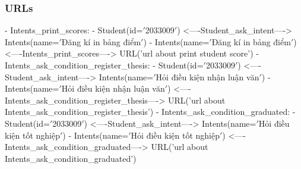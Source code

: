             \subsubsection{URLs}
            - Intents\_print\_scores:
                  - Student(id=\('\)2033009\('\)) <----Student\_ask\_intent----> Intents(name=\('\)Đăng kí in bảng điểm\('\))
                  - Intents(name=\('\)Đăng kí in bảng điểm\('\)) <----Intents\_print\_scores----> URL('url about print student score')
            - Intents\_ask\_condition\_register\_thesis:
                  - Student(id=\('\)2033009\('\)) <----Student\_ask\_intent----> Intents(name=\('\)Hỏi điều kiện nhận luận văn\('\))
                  - Intents(name=\('\)Hỏi điều kiện nhận luận văn\('\)) <----Intents\_ask\_condition\_register\_thesis----> URL('url about Intents\_ask\_condition\_register\_thesis')
            - Intents\_ask\_condition\_graduated:
                  - Student(id=\('\)2033009\('\)) <----Student\_ask\_intent----> Intents(name=\('\)Hỏi điều kiện tốt nghiệp\('\))
                  - Intents(name=\('\)Hỏi điều kiện tốt nghiệp\('\)) <----Intents\_ask\_condition\_graduated----> URL('url about Intents\_ask\_condition\_graduated')
